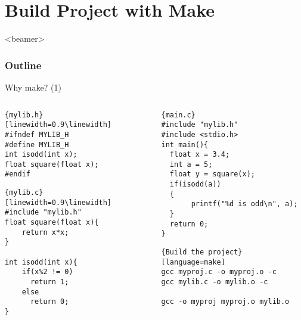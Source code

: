 \section{Build Project with Make}
\label{sec:make}
\begin{frame}<beamer>
    \frametitle{Outline}
    \tableofcontents[currentsection]
\end{frame}

\begin{frame}[fragile]{Why make? (1)}
\vspace{-0.3in}
\begin{columns}
\begin{column}{0.4\linewidth}
\begin{lstlisting}{mylib.h}[linewidth=0.9\linewidth]
#ifndef MYLIB_H
#define MYLIB_H
int isodd(int x);
float square(float x);
#endif
\end{lstlisting}
\vspace{-0.1in}
\begin{lstlisting}{mylib.c}[linewidth=0.9\linewidth]
#include "mylib.h"
float square(float x){
    return x*x;
}

int isodd(int x){
    if(x%2 != 0)
      return 1;
    else
      return 0;
}
\end{lstlisting}
\end{column}
\begin{column}{0.54\linewidth}
\begin{lstlisting}{main.c}
#include "mylib.h"
#include <stdio.h>
int main(){
  float x = 3.4;
  int a = 5;
  float y = square(x);
  if(isodd(a))
  {
       printf("%d is odd\n", a);
  }
  return 0;
}
\end{lstlisting}
\vspace{-0.15in}
\begin{lstlisting}{Build the project}[language=make]
gcc myproj.c -o myproj.o -c
gcc mylib.c -o mylib.o -c

gcc -o myproj myproj.o mylib.o
\end{lstlisting}
\end{column}
\end{columns}
\end{frame}

